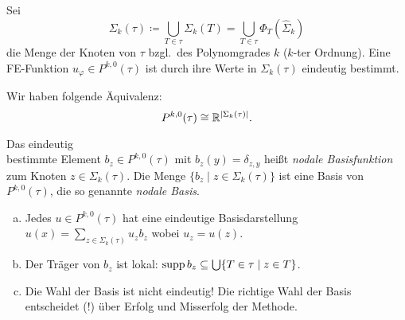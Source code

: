 \documentclass[../skript.tex]{subfiles}
\begin{document}
\begin{corollary}
\label{cor:c2e3s10}
	Sei
	\[
		\Sigma_k(\tau) \coloneqq \bigcup_{T\in\tau} \Sigma_k(T) = \bigcup_{T\in\tau}\Phi_T(\hat{\Sigma}_k)
	\]
	die Menge der Knoten von $\tau$ bzgl.~des Polynomgrades $k$ ($k$-ter Ordnung). Eine FE-Funktion $u_\varphi\in P^{k,0}(\tau)$ ist durch ihre Werte in $\Sigma_k(\tau)$ eindeutig bestimmt. 
\end{corollary}
\begin{remarknonumb}
	Wir haben folgende Äquivalenz: 
	\[
		P^{k,0}(\tau) \cong \mathbb{R}^{|\Sigma_k(\tau)|}.
	\]
\end{remarknonumb}
\begin{definition}\label{def:c2e3s11}
	Das eindeutig \\ bestimmte Element $b_z\in P^{k,0}(\tau)$ mit $b_z(y) = \delta_{z,y}$ heißt \emph{nodale Basisfunktion} zum Knoten $z\in\Sigma_k(\tau)$. Die Menge $\{b_z \mid z\in\Sigma_k(\tau)\}$ ist eine Basis von $P^{k,0}(\tau)$, die so genannte \emph{nodale Basis}.
\end{definition} 
\begin{remark}\label{rem:c2e3s12}
	\begin{enumerate}[(a)]
		\item Jedes $u\in P^{k,0}(\tau)$ hat eine eindeutige Basisdarstellung $u(x) = \sum_{z\in\Sigma_k(\tau)} u_z b_z$ wobei $u_z = u(z)$.
		\item Der Träger von $b_z$ ist lokal: $\operatorname*{supp} b_z\subseteq \bigcup\{T\in\tau \mid z\in T\}$.
		\item Die Wahl der Basis ist nicht eindeutig! Die richtige Wahl der Basis entscheidet (!) über Erfolg und Misserfolg der Methode.
	\end{enumerate}
 \end{remark}
\end{document}
